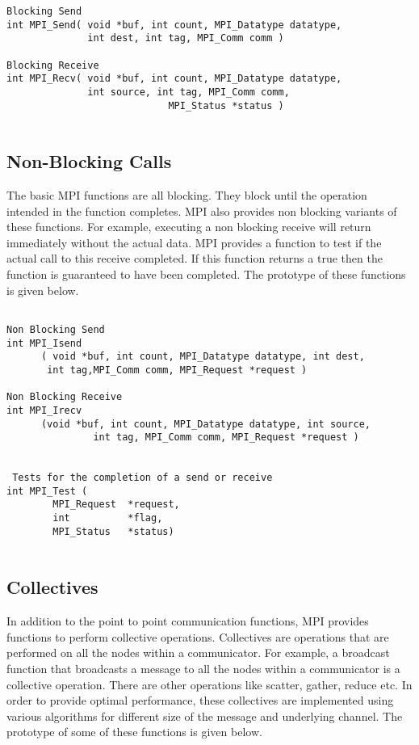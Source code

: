 \begin{verbatim}
Blocking Send
int MPI_Send( void *buf, int count, MPI_Datatype datatype,
              int dest, int tag, MPI_Comm comm ) 

Blocking Receive
int MPI_Recv( void *buf, int count, MPI_Datatype datatype,
              int source, int tag, MPI_Comm comm, 
                            MPI_Status *status )
              
\end{verbatim}
    
\subsection{Non-Blocking Calls}
    The basic MPI functions are all blocking. They block until the operation intended in the function completes. MPI also provides non blocking variants of these functions. For example, executing a non blocking receive will return immediately without the actual data. MPI provides a function to test if the actual call to this receive completed. If this function returns a true then the function is guaranteed to have been completed. The prototype of these functions is given below.

\begin{verbatim}

Non Blocking Send
int MPI_Isend
      ( void *buf, int count, MPI_Datatype datatype, int dest, 
       int tag,MPI_Comm comm, MPI_Request *request )

Non Blocking Receive
int MPI_Irecv
      (void *buf, int count, MPI_Datatype datatype, int source, 
               int tag, MPI_Comm comm, MPI_Request *request )


 Tests for the completion of a send or receive               
int MPI_Test ( 
        MPI_Request  *request,
        int          *flag,
        MPI_Status   *status) 
                      
\end{verbatim}
    
    
\subsection{Collectives}
    In addition to the point to point communication functions, MPI provides functions to perform collective operations. Collectives are operations that are performed on all the nodes within a communicator. For example, a broadcast function that broadcasts a message to all the nodes within a communicator is a collective operation. There are other operations like scatter, gather, reduce etc. In order to provide optimal performance, these collectives are implemented using various algorithms for different size of the message and underlying channel. The prototype of some of these functions is given below.

